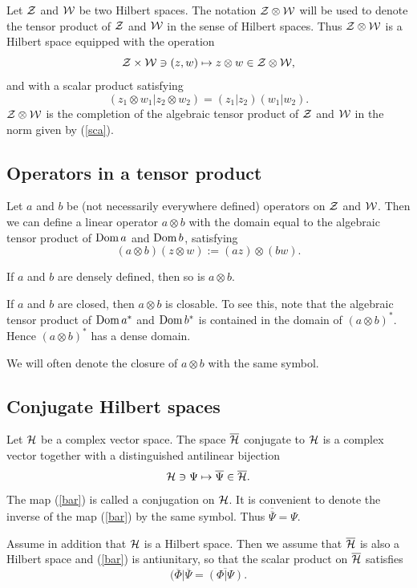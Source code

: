 \documentclass{svmult}
\newcommand{\beq}{\begin{equation}}
\newcommand{\eeq}{\end{equation}}
\def\bar{\overline}
\def\cZ{{\cal Z}}
\def\cW{{\cal W}}
\def\Dom{{\rm Dom}}
\def\cH{{\cal H}}
\def\cH{{\cal H}}
\begin{document}
Let 
$\cZ$ and $\cW$ be two Hilbert spaces. 
The notation $\cZ\otimes\cW$ will be used to denote the tensor product of
$\cZ$ and $\cW$ in the
sense of Hilbert spaces. 
Thus $\cZ\otimes\cW$
is a Hilbert space equipped with the operation
\[ \cZ\times\cW
\ni (z,w)\mapsto z\otimes w\in\cZ\otimes \cW,\]
and with a scalar product satisfying
\beq
(z_1\otimes w_1|z_2\otimes w_2)
=(z_1|z_2)(w_1|w_2).\label{sca}\eeq
$\cZ\otimes\cW$ is the
completion of the algebraic tensor product of $\cZ$ and $\cW$ in the norm
given by (\ref{sca}).



\subsection{Operators in a tensor product}
Let $a$ and $b$  be  (not necessarily everywhere defined) operators on $\cZ$
and $\cW$. Then we can define a linear
 operator $a\otimes b$ with the domain equal
to the algebraic tensor product of $\Dom\, a$ and  $\Dom\, b$,
satisfying
\[(a\otimes b) (z\otimes w):=(az)\otimes(bw).\]

If
$a$ and $b$ are densely defined, then so is $a\otimes b$.

If $a$ and $b$ are closed, then $a\otimes b$ is closable. To see this, note
that the algebraic tensor product of $\Dom\, a^*$ and $\Dom\, b^*$ is contained in
the domain of $(a\otimes b)^*$. Hence  $(a\otimes b)^*$ has a dense domain.

We will often denote the closure of $a\otimes b$ with the same symbol.





\subsection{Conjugate Hilbert spaces}
\label{s3.6}



Let $\cH$ be a complex  vector space.
The space $\bar\cH$ conjugate to $\cH$ is a complex vector
together  with a distinguished  antilinear bijection
\begin{equation}\cH\ni \Psi\mapsto\bar \Psi\in\bar\cH.\label{bar}\end{equation}
The map (\ref{bar}) is called a conjugation on $\cH$. 
It is convenient to denote the inverse of the map (\ref{bar}) by the same
symbol. Thus $\bar{\bar\Psi}=\Psi$.

Assume in addition that $\cH$ is a Hilbert space.
Then we assume that $\bar\cH$ is also a Hilbert space and (\ref{bar}) is
antiunitary, so that  the scalar product on $\bar \cH$ satisfies
\[(\bar\Phi|\bar\Psi=\bar{(\Phi|\Psi)}.\]
\end{document}
